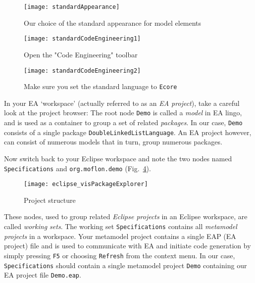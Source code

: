 \begin{figure}[htbp]
  \centering
  \texttt{[image: standardAppearance]}
  \caption{Our choice of the standard appearance for model elements}
  \label{ea:standardAppearanceEA}
\end{figure}

\begin{figure}[htbp]
    \centering
    \texttt{[image: standardCodeEngineering1]}
    \caption{Open the "Code Engineering" toolbar}
    \label{ea:standardSCEEA1}
 \end{figure}

\begin{figure}[htbp]
    \centering
    \texttt{[image: standardCodeEngineering2]}
    \caption{Make sure you set the standard language to \texttt{Ecore}}
    \label{ea:standardSCEEA2}
 \end{figure}
 
\clearpage

In your EA `workspace' (actually referred to as an \emph{EA project}), take a careful  look at the project browser:  The root node \texttt{Demo} is called a
\emph{model} in EA lingo, and is used as a container to group a set of related \emph{packages}. In our case, \texttt{Demo}  consists of a single package
\texttt{DoubleLinkedListLanguage}. An EA project however, can consist of numerous models that in turn, group numerous packages.

Now switch back to your Eclipse workspace and note the two nodes named \texttt{Spe\-ci\-fi\-ca\-tions} and \texttt{org.moflon.demo} (Fig.~\ref{eclipse:eclipsePS}).

\begin{figure}[htbp]
    \centering
    \texttt{[image: eclipse\_visPackageExplorer]}
    \caption{Project structure}
    \label{eclipse:eclipsePS}
 \end{figure}

These nodes, used to group related \emph{Eclipse projects} in an Eclipse workspace, are called \emph{working sets}. The working set
\texttt{Spe\-ci\-fi\-ca\-tions} contains all \emph{metamodel projects} in a  workspace. Your metamodel project contains a single EAP (EA project) file and is
used to communicate with EA and initiate code generation by simply pressing \texttt{F5} or choosing \texttt{Refresh} from the context menu. In our case,
\texttt{Specifications} should contain a single metamodel project \texttt{Demo} containing our EA project file  \texttt{Demo.eap}.
 
